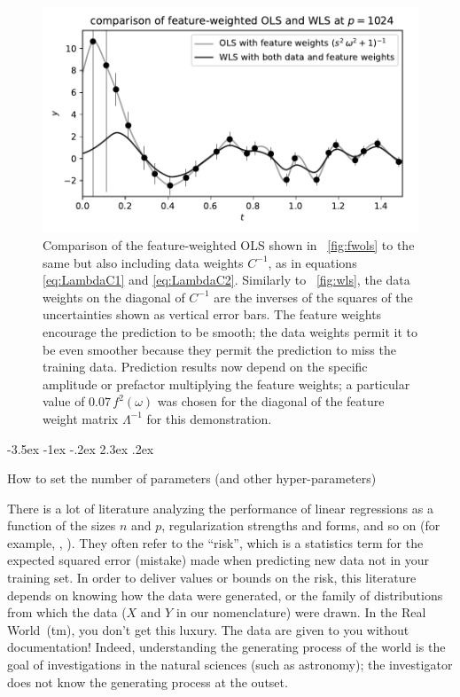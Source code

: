 \documentclass[12pt,letterpaper]{article}
\makeatletter
\newlength{\figurewidth}
\renewcommand\section{\@startsection {section}{1}{\z@}%
  {-3.5ex \@plus -1ex \@minus -.2ex}%
  {2.3ex \@plus.2ex}%
  {\raggedright\normalfont\Large\bfseries}}
\makeatother
\begin{document}
\begin{figure}[t]
    \begin{mdframed}
    \includegraphics[width=\figurewidth]{paper/weighted-WLS.pdf}
    \caption{Comparison of the feature-weighted OLS shown in \figurename~\ref{fig:fwols} to the same but also including data weights $C^{-1}$, as in equations \eqref{eq:LambdaC1} and \eqref{eq:LambdaC2}.
    Similarly to \figurename~\ref{fig:wls}, the data weights on the diagonal of $C^{-1}$ are the inverses of the squares of the uncertainties shown as vertical error bars. The feature weights encourage the prediction to be smooth; the data weights permit it to be even smoother because they permit the prediction to miss the training data.
    Prediction results now depend on the specific amplitude or prefactor multiplying the feature weights; a particular value of $0.07\,f^2(\omega)$ was chosen for the diagonal of the feature weight matrix $\Lambda^{-1}$ for this demonstration.}
    \label{fig:fwwls}
    \end{mdframed}
\end{figure}

\section{How to set the number of parameters (and other hyper-parameters)}\label{sec:dd}

There is a lot of literature analyzing the performance of linear regressions as a function of the sizes $n$ and $p$, regularization strengths and forms, and so on (for example, \citealt{bartlett2020benign}, \citealt{hastie2019surprises} ).
They often refer to the ``risk'', which is a statistics term for the expected squared error (mistake) made when predicting new data not in your training set.
In order to deliver values or bounds on the risk, this literature depends on knowing how the data were generated, or the family of distributions from which the data ($X$ and $Y$ in our nomenclature) were drawn.
In the Real World~(tm), you don't get this luxury.
The data are given to you without documentation!
Indeed, understanding the generating process of the world is the goal of investigations in the natural sciences (such as astronomy); the investigator does not know the generating process at the outset.
\end{document}
